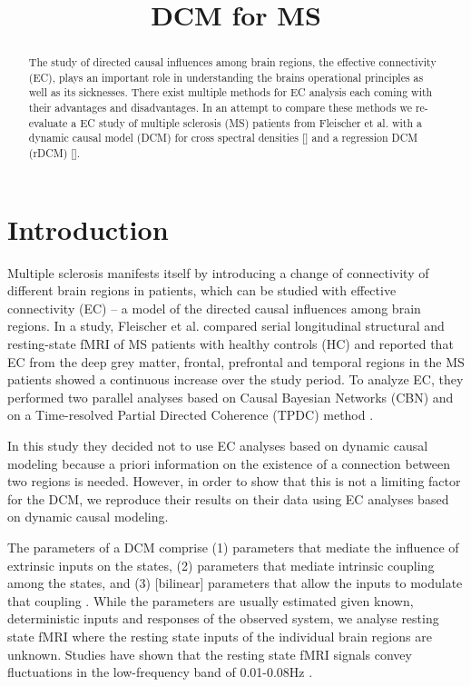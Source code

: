 \documentclass[a4paper,conference]{IEEEtran}
\title{DCM for MS}
\date{}
\begin{document}
\maketitle

\begin{abstract}
The study of directed causal influences among brain regions, the effective connectivity (EC), plays an important role in understanding the brains operational principles \cite{friston_functional_2011} as well as its sicknesses. 
There exist multiple methods for EC analysis each coming with their advantages and disadvantages. 
In an attempt to compare these methods we re-evaluate a EC study of multiple sclerosis (MS) patients from Fleischer et al. \cite{fleischer} with a dynamic causal model (DCM) for cross spectral densities [] and a regression DCM (rDCM) [].

\end{abstract}
\section{Introduction}

Multiple sclerosis manifests itself by introducing a change of connectivity of different brain regions in patients, which can be studied with effective connectivity (EC) – a model of the directed causal influences among brain regions. In a study, Fleischer et al. compared serial longitudinal structural and resting-state fMRI of MS patients with healthy controls (HC) and reported that EC from the deep grey matter, frontal, prefrontal and temporal regions in the MS patients showed a continuous increase over the study period. To analyze EC, they performed two parallel analyses based on Causal Bayesian Networks (CBN) \cite{smith2011network} and on a Time-resolved Partial Directed Coherence (TPDC) method \cite{vergotte2017dynamics}.

In this study they decided not to use EC analyses based on dynamic causal modeling because a priori information on the existence of a connection between two regions is needed.
However, in order to show that this is not a limiting factor for the DCM, we reproduce their results on their data using EC analyses based on dynamic causal modeling.

The parameters of a DCM comprise (1) parameters that mediate the influence of extrinsic inputs on the states, (2) parameters that mediate intrinsic coupling among the states, and (3) [bilinear] parameters that allow the inputs to modulate that coupling \cite{dcm}. While the parameters are usually estimated given known, deterministic inputs and responses of the observed system, we analyse resting state fMRI where the resting state inputs of the individual brain regions are unknown. Studies have shown that the resting state fMRI signals convey fluctuations in the low-frequency band of 0.01-0.08Hz \cite{csd_for_dcm, biswal1995functional, cordes2001frequencies}. 
\end{document}
